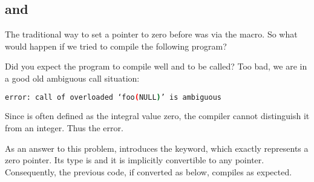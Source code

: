 \subsection{ and }

The traditional way to set a pointer to zero before  was via the
 macro. So what would happen if we tried to compile the
following program?



Did you expect the program to compile well and  to be
called? Too bad, we are in a good old ambiguous call situation:

\begin{lstlisting}[language=bash]
error: call of overloaded ‘foo(NULL)’ is ambiguous
\end{lstlisting}

Since  is often defined as the integral value zero, the
compiler cannot distinguish it from an integer. Thus the error.

\bigskip

As an answer to this problem,  introduces the 
keyword, which exactly represents a zero pointer. Its type is
 and it is implicitly convertible to any
pointer. Consequently, the previous code, if converted as below,
compiles as expected.


